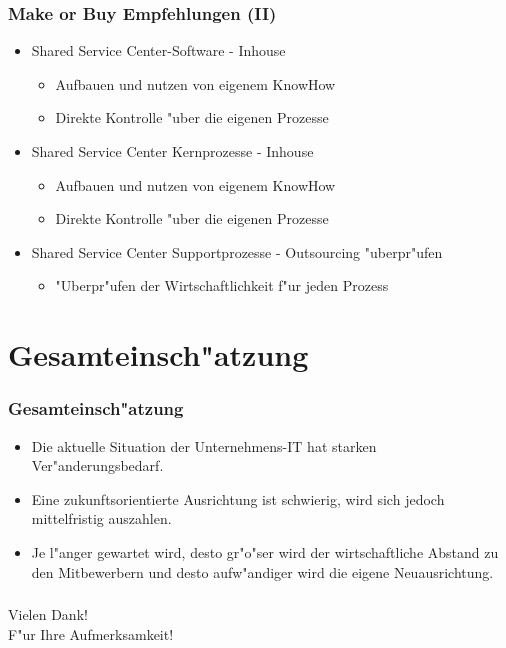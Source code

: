 \documentclass{beamer}
\begin{document}
\begin{frame}[plain]
  \frametitle{Make or Buy Empfehlungen (II)}
  \begin{itemize}
  
    \item Shared Service Center-Software - Inhouse
		\begin{itemize}
			\item Aufbauen und nutzen von eigenem KnowHow
			\item Direkte Kontrolle "uber die eigenen Prozesse\vspace{2mm}
		\end{itemize}

	\item Shared Service Center Kernprozesse - Inhouse
		\begin{itemize}
			\item Aufbauen und nutzen von eigenem KnowHow
			\item Direkte Kontrolle "uber die eigenen Prozesse\vspace{2mm}
		\end{itemize}
			
	\item Shared Service Center Supportprozesse - Outsourcing "uberpr"ufen
			\begin{itemize}
			\item "Uberpr"ufen der Wirtschaftlichkeit f"ur jeden Prozess
		\end{itemize}
	
  \end{itemize}
\end{frame}

\section{Gesamteinsch"atzung}
\begin{frame}[plain]

  \frametitle{Gesamteinsch"atzung}
   \begin{itemize}
   	\item Die aktuelle Situation der Unternehmens-IT hat starken Ver"anderungsbedarf.\vspace{2mm}
   	\item Eine zukunftsorientierte Ausrichtung ist schwierig, wird sich jedoch mittelfristig auszahlen.\vspace{2mm}
   \item Je l"anger gewartet wird, desto gr"o"ser wird der wirtschaftliche Abstand zu den Mitbewerbern und desto aufw"andiger wird die eigene Neuausrichtung. 
   \end{itemize}

\end{frame}

\begin{frame}[plain]

  \frametitle{ }
   	Vielen Dank! \\
	F"ur Ihre Aufmerksamkeit!

\end{frame}
\end{document}
